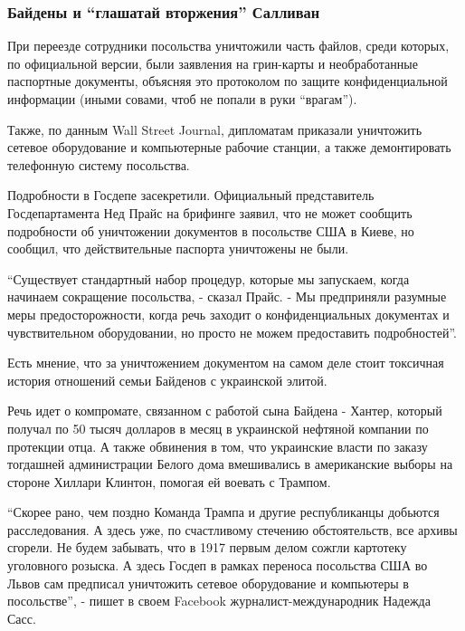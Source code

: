  
 
 
 
 

\subsubsection{Байдены и \enquote{глашатай вторжения} Салливан}

При переезде сотрудники посольства уничтожили часть файлов, среди которых, по
официальной версии, были заявления на грин-карты и необработанные паспортные
документы, объясняя это протоколом по защите конфиденциальной информации (иными
совами, чтоб не попали в руки \enquote{врагам}).

Также, по данным Wall Street Journal, дипломатам приказали уничтожить сетевое
оборудование и компьютерные рабочие станции, а также демонтировать телефонную
систему посольства.

Подробности в Госдепе засекретили. Официальный представитель Госдепартамента
Нед Прайс на брифинге заявил, что не может сообщить подробности об уничтожении
документов в посольстве США в Киеве, но сообщил, что действительные паспорта
уничтожены не были.

\enquote{Существует стандартный набор процедур, которые мы запускаем, когда начинаем
сокращение посольства, - сказал Прайс. - Мы предприняли разумные меры
предосторожности, когда речь заходит о конфиденциальных документах и
чувствительном оборудовании, но просто не можем предоставить
подробностей}.

Есть мнение, что за уничтожением документом на самом деле стоит токсичная
история отношений семьи Байденов с украинской элитой.

Речь идет о компромате, связанном с работой сына Байдена - Хантер, который
получал по 50 тысяч долларов в месяц в украинской нефтяной компании по
протекции отца. А также обвинения в том, что украинские власти по заказу
тогдашней администрации Белого дома вмешивались в американские выборы на
стороне Хиллари Клинтон, помогая ей воевать с Трампом.

\enquote{Скорее рано, чем поздно Команда Трампа и другие республиканцы добьются
расследования. А здесь уже, по счастливому стечению обстоятельств, все архивы
сгорели. Не будем забывать, что в 1917 первым делом сожгли картотеку уголовного
розыска. А здесь Госдеп в рамках переноса посольства США во Львов сам предписал
уничтожить сетевое оборудование и компьютеры в посольстве}, - пишет в своем
Facebook журналист-международник Надежда Сасс.

